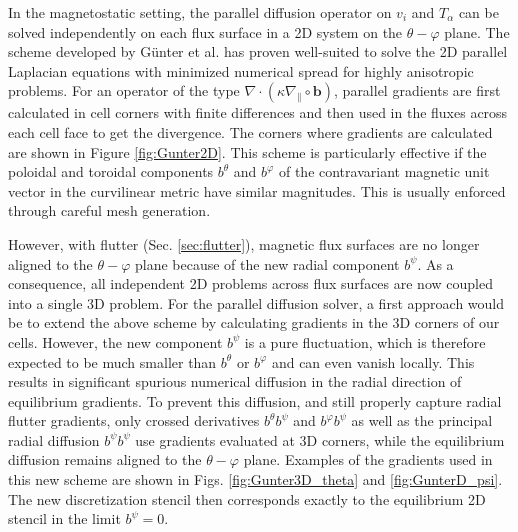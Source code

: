 In the magnetostatic setting, the parallel diffusion operator on $v_i$ and $T_\alpha$ can be solved independently on each flux surface in a 2D system on the $\theta - \varphi$ plane. The scheme developed by Günter et al. \cite{gunter2005} has proven well-suited to solve the 2D parallel Laplacian equations with minimized numerical spread for highly anisotropic problems. For an operator of the type $\nabla \cdot (\kappa \nabla_\parallel \circ \mathbf{b} )$, parallel gradients are first calculated in cell corners with finite differences and then used in the fluxes across each cell face to get the divergence. The corners where gradients are calculated are shown in Figure \ref{fig:Gunter2D}. This scheme is particularly effective if the poloidal and toroidal components $b^\theta$ and $b^\varphi$ of the contravariant magnetic unit vector in the curvilinear metric have similar magnitudes. This is usually enforced through careful mesh generation. \newline

However, with flutter (Sec. \ref{sec:flutter}), magnetic flux surfaces are no longer aligned to the $\theta - \varphi$ plane because of the new radial component $b^\psi$. As a consequence, all independent 2D problems across flux surfaces are now coupled into a single 3D problem. For the parallel diffusion solver, a first approach would be to extend the above scheme by calculating gradients in the 3D corners of our cells. However, the new component $b^\psi$ is a pure fluctuation, which is therefore expected to be much smaller than $b^\theta$ or $b^\varphi$ and can even vanish locally. This results in significant spurious numerical diffusion in the radial direction of equilibrium gradients. To prevent this diffusion, and still properly capture radial flutter gradients, only crossed derivatives $b^\theta b^\psi$ and $b^\varphi b^\psi$ as well as the principal radial diffusion $b^\psi b^\psi$ use gradients evaluated at 3D corners, while the equilibrium diffusion remains aligned to the $\theta - \varphi$ plane. Examples of the gradients used in this new scheme are shown in Figs. \ref{fig:Gunter3D_theta} and \ref{fig:GunterD_psi}. The new discretization stencil then corresponds exactly to the equilibrium 2D stencil in the limit $b^\psi=0$. \newline

